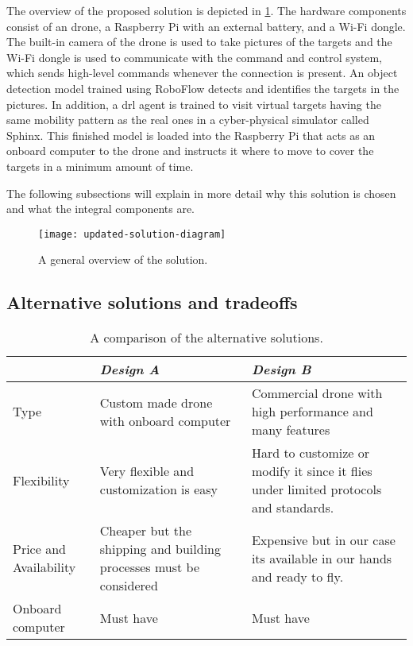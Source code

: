\documentclass[../main.tex]{subfiles}
\begin{document}
	
The overview of the proposed solution is depicted in 
\cref{fig:solution-overview}. 
The hardware components consist of an \anafi drone,
a Raspberry Pi with an external battery, and a Wi-Fi
dongle. The built-in camera of the drone is used to
take pictures of the targets and the Wi-Fi dongle
is used to communicate with the command and control
system, which sends high-level commands whenever the
connection is present. An object detection model trained
using RoboFlow detects and identifies the targets in the
pictures. In addition, a \gls{drl} agent is trained to
visit virtual targets having the same mobility pattern as the
real ones in a cyber-physical simulator called Sphinx.
This finished model is loaded into the Raspberry Pi that acts
as an onboard computer to the \anafi drone and instructs
it where to move to cover the targets in a minimum amount
of time.

The following subsections will
explain in more detail why this solution is chosen
and what the integral components are.

\begin{figure}[tbp]
	\centering
	\texttt{[image: updated-solution-diagram]}
	\caption{A general overview of the solution.}
	\label{fig:solution-overview}
\end{figure}

\subsection{Alternative solutions and tradeoffs}

\begin{table}[H]
    \centering
    \caption{A comparison of the alternative solutions.}
    \label{tab:alt-solutions}
    \begin{tabular}{ p{4cm} p{6cm} p{6cm} }
        \toprule
        \textit{} & \textit{Design A} & \textit{Design B}\\ \midrule
        Type  & Custom made drone with onboard computer & Commercial drone with high performance and many features    \\
        Flexibility & Very flexible and customization is easy & Hard to customize or modify it since it flies under limited protocols and standards. \\

        Price and Availability & Cheaper but the shipping and building processes must be considered & Expensive but in our case its available in our hands and ready to fly.   \\

        Onboard computer & Must have & Must have \\
        \bottomrule
    \end{tabular}
\end{table} 
\end{document}
